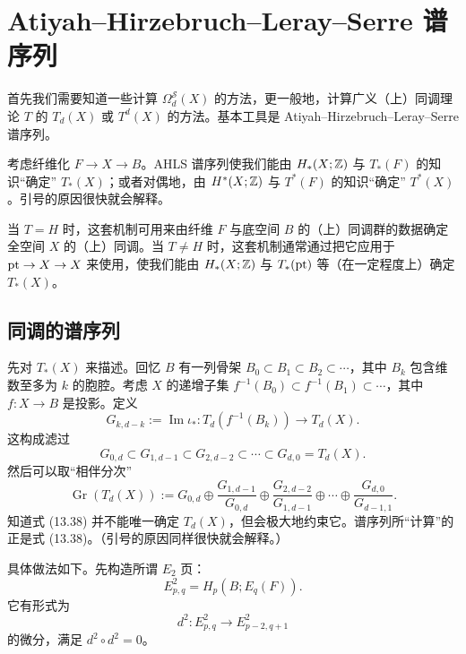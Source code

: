 
\section{Atiyah--Hirzebruch--Leray--Serre 谱序列}

首先我们需要知道一些计算 $\Omega_d^{\mathcal S}(X)$ 的方法，更一般地，计算广义（上）同调理论 $T$ 的 $T_d(X)$ 或 $T^d(X)$ 的方法。基本工具是 Atiyah--Hirzebruch--Leray--Serre 谱序列。

考虑纤维化 $F\to X\to B$。AHLS 谱序列使我们能由 $H_*(X;\mathbb{Z})$ 与 $T_*(F)$ 的知识“确定” $T_*(X)$；或者对偶地，由 $H^*(X;\mathbb{Z})$ 与 $T^*(F)$ 的知识“确定” $T^*(X)$。引号的原因很快就会解释。

当 $T=H$ 时，这套机制可用来由纤维 $F$ 与底空间 $B$ 的（上）同调群的数据确定全空间 $X$ 的（上）同调。当 $T\neq H$ 时，这套机制通常通过把它应用于 $\mathrm{pt}\to X\to X$ 来使用，使我们能由 $H_*(X;\mathbb{Z})$ 与 $T_*(\mathrm{pt})$ 等（在一定程度上）确定 $T_*(X)$。

\subsection{同调的谱序列}

先对 $T_*(X)$ 来描述。回忆 $B$ 有一列骨架 $B_0\subset B_1\subset B_2\subset\cdots$，其中 $B_k$ 包含维数至多为 $k$ 的胞腔。考虑 $X$ 的递增子集 $f^{-1}(B_0)\subset f^{-1}(B_1)\subset\cdots$，其中 $f:X\to B$ 是投影。定义
\begin{equation}
G_{k,d-k}:=\operatorname{Im}\iota_*:T_d(f^{-1}(B_k))\to T_d(X). \tag{13.36}
\end{equation}
这构成滤过
\begin{equation}
G_{0,d}\subset G_{1,d-1}\subset G_{2,d-2}\subset\cdots\subset G_{d,0}=T_d(X). \tag{13.37}
\end{equation}
然后可以取“相伴分次”
\begin{equation}
\operatorname{Gr}(T_d(X)):=G_{0,d}\oplus\frac{G_{1,d-1}}{G_{0,d}}\oplus\frac{G_{2,d-2}}{G_{1,d-1}}\oplus\cdots\oplus\frac{G_{d,0}}{G_{d-1,1}}. \tag{13.38}
\end{equation}
知道式 (13.38) 并不能唯一确定 $T_d(X)$，但会极大地约束它。谱序列所“计算”的正是式 (13.38)。（引号的原因同样很快就会解释。）

具体做法如下。先构造所谓 $E_2$ 页：
\begin{equation}
E_{p,q}^2=H_p(B;E_q(F)). \tag{13.39}
\end{equation}
它有形式为
\begin{equation}
d^2:E_{p,q}^2\to E_{p-2,q+1}^2 \tag{13.40}
\end{equation}
的微分，满足 $d^2\circ d^2=0$。

